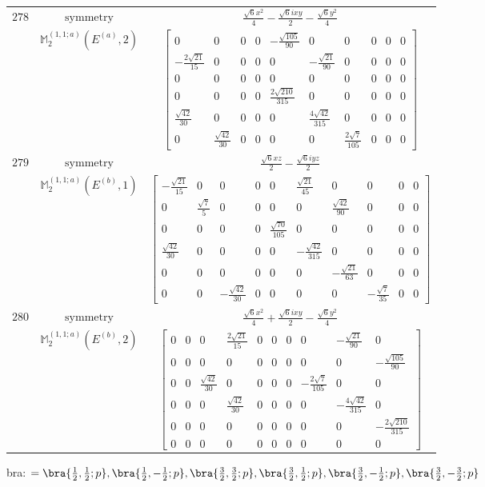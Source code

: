 \documentclass[fleqn,8pt,landscape]{jsarticle}
\begin{document}
\begin{longtable}{ccc}
$ 278 $ & $ \text{symmetry} $ & $ \frac{\sqrt{6} x^{2}}{4} - \frac{\sqrt{6} i x y}{2} - \frac{\sqrt{6} y^{2}}{4} $ \\
$  $ & $ \mathbb{M}_{2}^{(1,1;a)}(E^{(a)},2) $ & $ \begin{bmatrix} 0 & 0 & 0 & 0 & - \frac{\sqrt{105}}{90} & 0 & 0 & 0 & 0 & 0 \\ - \frac{2 \sqrt{21}}{15} & 0 & 0 & 0 & 0 & - \frac{\sqrt{21}}{90} & 0 & 0 & 0 & 0 \\ 0 & 0 & 0 & 0 & 0 & 0 & 0 & 0 & 0 & 0 \\ 0 & 0 & 0 & 0 & \frac{2 \sqrt{210}}{315} & 0 & 0 & 0 & 0 & 0 \\ \frac{\sqrt{42}}{30} & 0 & 0 & 0 & 0 & \frac{4 \sqrt{42}}{315} & 0 & 0 & 0 & 0 \\ 0 & \frac{\sqrt{42}}{30} & 0 & 0 & 0 & 0 & \frac{2 \sqrt{7}}{105} & 0 & 0 & 0 \end{bmatrix} $ \\ \hline
$ 279 $ & $ \text{symmetry} $ & $ \frac{\sqrt{6} x z}{2} - \frac{\sqrt{6} i y z}{2} $ \\
$  $ & $ \mathbb{M}_{2}^{(1,1;a)}(E^{(b)},1) $ & $ \begin{bmatrix} - \frac{\sqrt{21}}{15} & 0 & 0 & 0 & 0 & \frac{\sqrt{21}}{45} & 0 & 0 & 0 & 0 \\ 0 & \frac{\sqrt{7}}{5} & 0 & 0 & 0 & 0 & \frac{\sqrt{42}}{90} & 0 & 0 & 0 \\ 0 & 0 & 0 & 0 & \frac{\sqrt{70}}{105} & 0 & 0 & 0 & 0 & 0 \\ \frac{\sqrt{42}}{30} & 0 & 0 & 0 & 0 & - \frac{\sqrt{42}}{315} & 0 & 0 & 0 & 0 \\ 0 & 0 & 0 & 0 & 0 & 0 & - \frac{\sqrt{21}}{63} & 0 & 0 & 0 \\ 0 & 0 & - \frac{\sqrt{42}}{30} & 0 & 0 & 0 & 0 & - \frac{\sqrt{7}}{35} & 0 & 0 \end{bmatrix} $ \\ \hline
$ 280 $ & $ \text{symmetry} $ & $ \frac{\sqrt{6} x^{2}}{4} + \frac{\sqrt{6} i x y}{2} - \frac{\sqrt{6} y^{2}}{4} $ \\
$  $ & $ \mathbb{M}_{2}^{(1,1;a)}(E^{(b)},2) $ & $ \begin{bmatrix} 0 & 0 & 0 & \frac{2 \sqrt{21}}{15} & 0 & 0 & 0 & 0 & - \frac{\sqrt{21}}{90} & 0 \\ 0 & 0 & 0 & 0 & 0 & 0 & 0 & 0 & 0 & - \frac{\sqrt{105}}{90} \\ 0 & 0 & \frac{\sqrt{42}}{30} & 0 & 0 & 0 & 0 & - \frac{2 \sqrt{7}}{105} & 0 & 0 \\ 0 & 0 & 0 & \frac{\sqrt{42}}{30} & 0 & 0 & 0 & 0 & - \frac{4 \sqrt{42}}{315} & 0 \\ 0 & 0 & 0 & 0 & 0 & 0 & 0 & 0 & 0 & - \frac{2 \sqrt{210}}{315} \\ 0 & 0 & 0 & 0 & 0 & 0 & 0 & 0 & 0 & 0 \end{bmatrix} $ \\ \hline
\end{longtable}
bra: $=\bra{\frac{1}{2},\frac{1}{2};p}, \bra{\frac{1}{2},- \frac{1}{2};p}, \bra{\frac{3}{2},\frac{3}{2};p}, \bra{\frac{3}{2},\frac{1}{2};p}, \bra{\frac{3}{2},- \frac{1}{2};p}, \bra{\frac{3}{2},- \frac{3}{2};p}$
\end{document}
